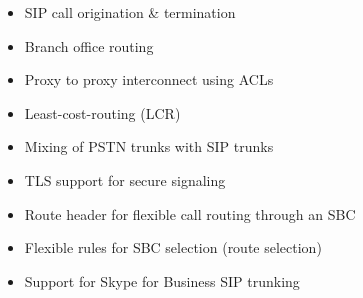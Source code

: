 \documentclass[letterpaper,10pt,english]{sphinxmanual}
\begin{document}
\begin{itemize}
\item {} 
SIP call origination \& termination

\item {} 
Branch office routing

\item {} 
Proxy to proxy interconnect using ACLs

\item {} 
Least-cost-routing (LCR)

\item {} 
Mixing of PSTN trunks with SIP trunks

\item {} 
TLS support for secure signaling

\item {} 
Route header for flexible call routing through an SBC

\item {} 
Flexible rules for SBC selection (route selection)

\item {} 
Support for Skype for Business SIP trunking

\end{itemize}
\end{document}
